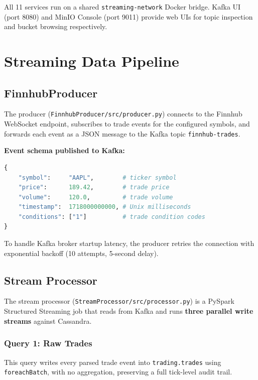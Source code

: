 \documentclass[a4paper]{article}
\begin{document}
All 11 services run on a shared \texttt{streaming-network} Docker bridge.
Kafka UI (port 8080) and MinIO Console (port 9011) provide web UIs for topic
inspection and bucket browsing respectively.

\section{Streaming Data Pipeline}

\subsection{FinnhubProducer}

The producer (\texttt{FinnhubProducer/src/producer.py}) connects to the Finnhub
WebSocket endpoint, subscribes to trade events for the configured symbols, and
forwards each event as a JSON message to the Kafka topic \texttt{finnhub-trades}.

\textbf{Event schema published to Kafka:}
\begin{lstlisting}[language=Python]
{
    "symbol":     "AAPL",        # ticker symbol
    "price":      189.42,        # trade price
    "volume":     120.0,         # trade volume
    "timestamp":  1718000000000, # Unix milliseconds
    "conditions": ["1"]          # trade condition codes
}
\end{lstlisting}

To handle Kafka broker startup latency, the producer retries the connection with
exponential backoff (10 attempts, 5-second delay).

\subsection{Stream Processor}

The stream processor (\texttt{StreamProcessor/src/processor.py}) is a PySpark
Structured Streaming job that reads from Kafka and runs \textbf{three parallel
write streams} against Cassandra.

\subsubsection{Query 1: Raw Trades}
This query writes every parsed trade event into \texttt{trading.trades} using
\texttt{foreachBatch}, with no aggregation, preserving a full tick-level audit trail.
\end{document}
